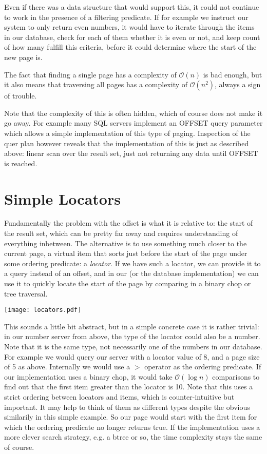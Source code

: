 \documentclass[11pt,a4paper]{article}
\begin{document}
\begin{multicols}{2}
Even if there was a data structure that would support this, it could not
continue to work in the presence of a filtering predicate. If for example we
instruct our system to only return even numbers, it would have to iterate
through the items in our database, check for each of them whether it is even or
not, and keep count of how many fulfill this criteria, before it could determine
where the start of the new page is.

The fact that finding a single page has a complexity of $\mathcal{O}(n)$ is bad
enough, but it also means that traversing all pages has a complexity of
$\mathcal{O}(n^2)$, always a sign of trouble.

Note that the complexity of this is often hidden, which of course does not make
it go away. For example many SQL servers implement an OFFSET query parameter
which allows a simple implementation of this type of paging. Inspection of the 
quer plan however reveals that the implementation of this is just as described above:
linear scan over the result set, just not returning any data until OFFSET is
reached.

\section*{Simple Locators}

Fundamentally the problem with the offset is what it is relative to: the start
of the result set, which can be pretty far away and requires understanding of
everything inbetween. The alternative is to use something much closer to the
current page, a virtual item that sorts just before the start of the page under
some ordering predicate: a {\em locator}. If we have such a locator, we can provide it
to a query instead of an offset, and in our (or the database implementation) we
can use it to quickly locate the start of the page by comparing in a binary chop
or tree traversal.

\texttt{[image: locators.pdf]}

This sounds a little bit abstract, but in a simple concrete case it is rather
trivial: in our number server from above, the type of the locator could also be
a number. Note that it is the same type, not necessarily one of the numbers in
our database. For example we would query our server with a locator value of 8,
and a page size of 5 as above. Internally we would use a $>$ operator as the
ordering predicate. If our implementation uses a binary chop, it would take
$\mathcal{O}(\log{}n)$ comparisons to find out that the first item greater than
the locator is 10. Note that this uses a
strict ordering between locators and items, which is counter-intuitive but
important. It may help to think of them as different types despite the obvious
similarily in this simple example. So our page would start with the first item
for which the ordering predicate no longer returns true. If the implementation
uses a more clever search strategy, e.g. a btree or so, the time complexity
stays the same of course.


\end{multicols}
\end{document}
